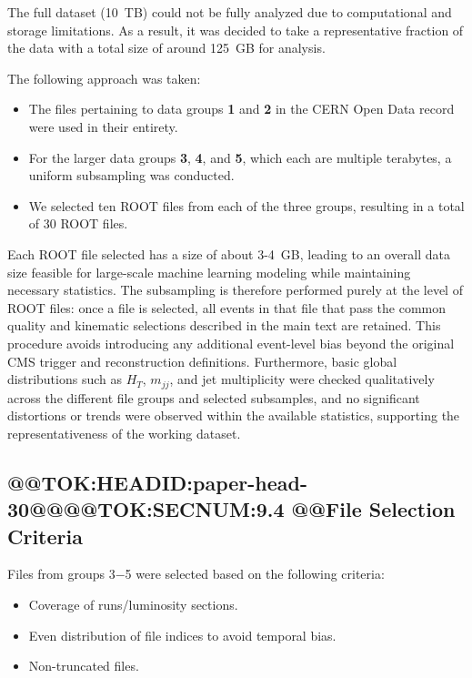 \documentclass[11pt]{article}
\begin{document}
The full dataset (10~TB) could not be fully analyzed due to computational and storage limitations.
As a result, it was decided to take a representative fraction of the data with a total size of around 125~GB for analysis.

The following approach was taken:
\begin{itemize}
    \item The files pertaining to data groups \textbf{1} and \textbf{2} in the CERN Open Data record were used in their entirety. 
    \item For the larger data groups \textbf{3}, \textbf{4}, and \textbf{5}, which each are multiple terabytes, a uniform subsampling was conducted. 
    \item We selected ten ROOT files from each of the three groups, resulting in a total of 30 ROOT files.
\end{itemize}

Each ROOT file selected has a size of about 3-4~GB, leading to an overall data size feasible for large-scale machine learning modeling while maintaining necessary statistics. The subsampling is therefore performed purely at the level of ROOT files: once a file is selected, all events in that file that pass the common quality and kinematic selections described in the main text are retained. This procedure avoids introducing any additional event-level bias beyond the original CMS trigger and reconstruction definitions. Furthermore, basic global distributions such as $H_T$, $m_{jj}$, and jet multiplicity were checked qualitatively across the different file groups and selected subsamples, and no significant distortions or trends were observed within the available statistics, supporting the representativeness of the working dataset.

\subsection{@@TOK:HEADID:paper-head-30@@@@TOK:SECNUM:9.4 @@File Selection Criteria}

Files from groups 3$-$5 were selected based on the following criteria: 
\begin{itemize}
    \item Coverage of runs/luminosity sections.
    \item Even distribution of file indices to avoid temporal bias.
    \item Non-truncated files.
\end{itemize}
\end{document}
